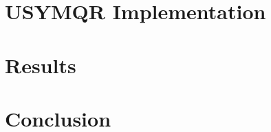 \documentclass[10pt,letterpaper]{article}
\begin{document}
\section{USYMQR Implementation} 



\section{Results} 





\section{Conclusion} 




\end{document}
